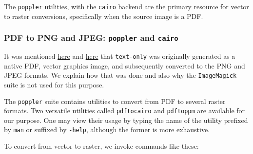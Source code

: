 \documentclass[
  11pt,
  british,
  a4paper,
]{article}
\begin{document}
The \texttt{poppler} utilities, with the \texttt{cairo} backend are the
primary resource for vector to raster conversions, specifically when the
source image is a PDF.

\hypertarget{pdf-to-png-and-jpeg-poppler-and-cairo}{%
\subsubsection{\texorpdfstring{PDF to PNG and JPEG: \texttt{poppler} and
\texttt{cairo}}{PDF to PNG and JPEG: poppler and cairo}}\label{pdf-to-png-and-jpeg-poppler-and-cairo}}

It was mentioned \protect\hyperlink{the-text-only-image}{here} and
\protect\hyperlink{results-with-text-only}{here} that \texttt{text-only}
was originally generated as a native PDF, vector graphics image, and
subsequently converted to the PNG and JPEG formats. We explain how that
was done and also why the \texttt{ImageMagick} suite is not used for
this purpose.

The \texttt{poppler} suite contains utilities to convert from PDF to
several raster formats. Two versatile utilities called
\texttt{pdftocairo} and \texttt{pdftoppm} are available for our purpose.
One may view their usage by typing the name of the utility prefixed by
\texttt{man} or suffixed by \texttt{-help}, although the former is more
exhaustive.

To convert from vector to raster, we invoke commands like these:
\end{document}
